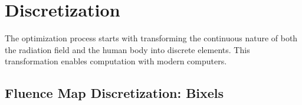 
\section{Discretization}
The optimization process starts with transforming the continuous nature of both the radiation field and the human body into discrete elements.
This transformation enables computation with modern computers.

\subsection[Bixels]{Fluence Map Discretization: Bixels}



